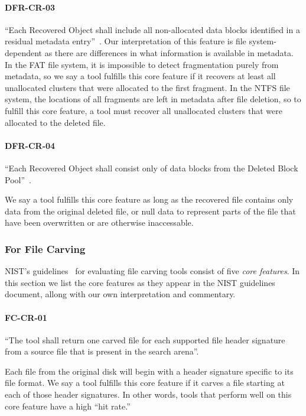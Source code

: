  \paragraph{DFR-CR-03} ``Each Recovered Object shall include all non-allocated data blocks identified in a residual metadata entry''~\cite{meta:dfr:standards}.
 Our interpretation of this feature is file system-dependent as there are differences in what information is available in metadata.
 In the FAT file system, it is impossible to detect fragmentation purely from metadata, so we say a tool fulfills this core feature if it recovers at least all unallocated clusters that were allocated to the first fragment.
 In the NTFS file system, the locations of all fragments are left in metadata after file deletion, so to fulfill this core feature, a tool must recover all unallocated clusters that were allocated to the deleted file.


 \paragraph{DFR-CR-04} ``Each Recovered Object shall consist only of data blocks from the Deleted Block Pool''~\cite{meta:dfr:standards}.
 
 We say a tool fulfills this core feature as long as the recovered file contains only data from the original deleted file, or null data to represent parts of the file that have been overwritten or are otherwise inaccessable.

\subsubsection{For File Carving} \label{sec:carving_features}

NIST's guidelines~\cite{carving_standards} for evaluating file carving tools consist of five \emph{core features}.
In this section we list the core features as they appear in the NIST guidelines document, allong with our own interpretation and commentary.

 \paragraph{FC-CR-01} ``The tool shall return one carved file for each supported file header signature from a source file that is present in the search arena''.~\cite{carving_standards}
 
 Each file from the original disk will begin with a header signature specific to its file format. We say a tool fulfills this core feature if it carves a file starting at each of those header signatures.
 In other words, tools that perform well on this core feature have a high ``hit rate.''
 
